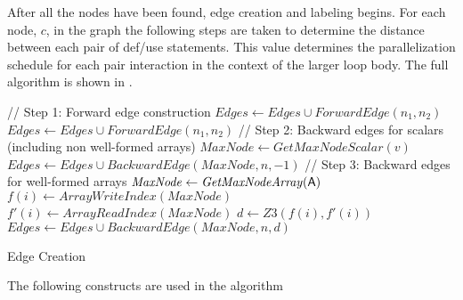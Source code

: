 After all the nodes have been found, edge creation and labeling begins. 
For each node, $c$, in the graph the following steps are taken to determine 
the distance between each pair of def/use statements. This value determines 
the parallelization schedule for each pair interaction 
in the context of the larger loop body. The full algorithm is shown in 
.

\begin{algorithm}
\begin{algorithmic}
\State // Step 1: Forward edge construction 
\State $\mathit{Edges} \leftarrow \mathit{Edges} \cup \mathit{ForwardEdge}(n_1, n_2)$
\EndIf
\EndFor
{}
\State $\mathit{Edges} \leftarrow \mathit{Edges} \cup \mathit{ForwardEdge}(n_1, n_2)$
\EndIf
\EndFor
\EndIf
\EndFor
\EndFor
\State // Step 2: Backward edges for scalars (including non well-formed arrays)
\State $\mathit{MaxNode} \leftarrow \mathit{GetMaxNodeScalar}(v)$
\State $\mathit{Edges} \leftarrow \mathit{Edges} \cup \mathit{BackwardEdge}(\mathit{MaxNode}, n, -1)$
\EndIf
\EndFor
\EndFor
\State // Step 3: Backward edges for well-formed arrays
\State $\mathit{MaxNode} \leftarrow \mathit{GetMaxNodeArray}({\sf A})$
\State $f(i) \leftarrow \mathit{ArrayWriteIndex}(\mathit{MaxNode})$
\State $f'(i) \leftarrow \mathit{ArrayReadIndex}(\mathit{MaxNode})$
\State $d \leftarrow \mathit{Z3}(f(i), f'(i))$
\State $\mathit{Edges} \leftarrow \mathit{Edges} \cup \mathit{BackwardEdge}(\mathit{MaxNode}, n, d)$
\EndIf
\EndFor
\EndFor
\end{algorithmic}
\caption{Edge Creation}
\label{alg:edgecreation}
\end{algorithm}


The following constructs are used in the algorithm

